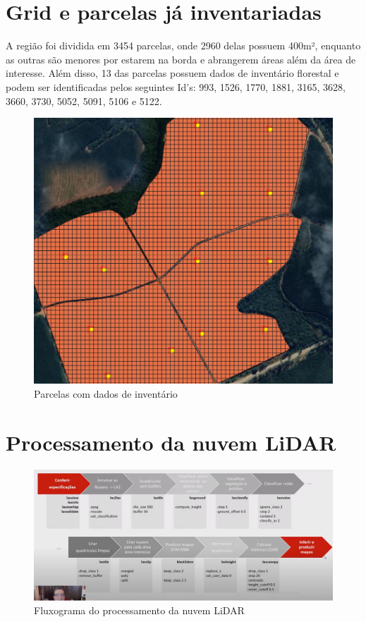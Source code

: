\documentclass[
]{article}
\begin{document}
\newpage

\section{Grid e parcelas já
inventariadas}\label{grid-e-parcelas-juxe1-inventariadas}

A região foi dividida em 3454 parcelas, onde 2960 delas possuem 400m²,
enquanto as outras são menores por estarem na borda e abrangerem áreas
além da área de interesse. Além disso, 13 das parcelas possuem dados de
inventário florestal e podem ser identificadas pelos seguintes Id's:
993, 1526, 1770, 1881, 3165, 3628, 3660, 3730, 5052, 5091, 5106 e 5122.

\begin{figure}

{\centering \includegraphics[width=0.4\linewidth]{IMAGES/parcelasinventariadas} 

}

\caption{Parcelas com dados de inventário}\label{fig:unnamed-chunk-5}
\end{figure}

\newpage

\section{Processamento da nuvem
LiDAR}\label{processamento-da-nuvem-lidar}

\begin{figure}

{\centering \includegraphics[width=0.8\linewidth]{IMAGES/fluxograma-funcoes} 

}

\caption{Fluxograma do processamento da nuvem LiDAR}\label{fig:unnamed-chunk-6}
\end{figure}
\end{document}
